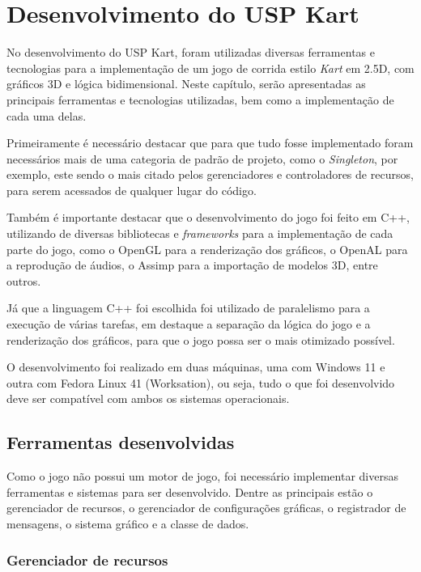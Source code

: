 \chapter{Desenvolvimento do USP Kart}

No desenvolvimento do USP Kart, foram utilizadas diversas ferramentas e tecnologias para a implementação de um jogo de corrida estilo \textit{Kart} em 2.5D, com gráficos 3D e lógica bidimensional. Neste capítulo, serão apresentadas as principais ferramentas e tecnologias utilizadas, bem como a implementação de cada uma delas.

Primeiramente é necessário destacar que para que tudo fosse implementado foram necessários mais de uma categoria de padrão de projeto, como o \textit{Singleton}, por exemplo, este sendo o mais citado pelos gerenciadores e controladores de recursos, para serem acessados de qualquer lugar do código.

Também é importante destacar que o desenvolvimento do jogo foi feito em C++, utilizando de diversas bibliotecas e \textit{frameworks} para a implementação de cada parte do jogo, como o OpenGL para a renderização dos gráficos, o OpenAL para a reprodução de áudios, o Assimp para a importação de modelos 3D, entre outros.

Já que a linguagem C++ foi escolhida foi utilizado de paralelismo para a execução de várias tarefas, em destaque a separação da lógica do jogo e a renderização dos gráficos, para que o jogo possa ser o mais otimizado possível.

O desenvolvimento foi realizado em duas máquinas, uma com Windows 11 e outra com Fedora Linux 41 (Worksation), ou seja, tudo o que foi desenvolvido deve ser compatível com ambos os sistemas operacionais.

\section{Ferramentas desenvolvidas}

Como o jogo não possui um motor de jogo, foi necessário implementar diversas ferramentas e sistemas para ser desenvolvido. Dentre as principais estão o gerenciador de recursos, o gerenciador de configurações gráficas, o registrador de mensagens, o sistema gráfico e a classe de dados.

\subsection{Gerenciador de recursos}


